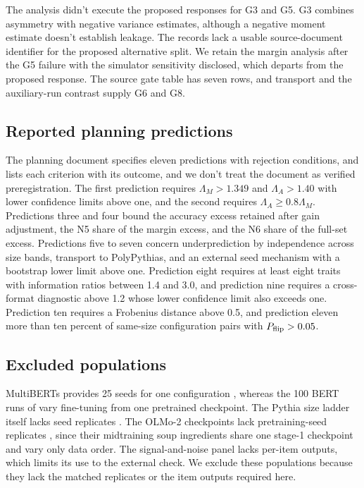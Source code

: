The analysis didn't execute the proposed responses for G3 and G5. G3 combines asymmetry with negative variance estimates, although a negative moment estimate doesn't establish leakage. The records lack a usable source-document identifier for the proposed alternative split. We retain the margin analysis after the G5 failure with the simulator sensitivity disclosed, which departs from the proposed response. The source gate table has seven rows, and transport and the auxiliary-run contrast supply G6 and G8.
\subsection{Reported planning predictions}
The planning document specifies eleven predictions with rejection conditions, and  lists each criterion with its outcome, and we don't treat the document as verified preregistration. The first prediction requires $\Lambda_M>1.349$ and $\Lambda_A>1.40$ with lower confidence limits above one, and the second requires $\Lambda_A\geq0.8\Lambda_M$. Predictions three and four bound the accuracy excess retained after gain adjustment, the N5 share of the margin excess, and the N6 share of the full-set excess. Predictions five to seven concern underprediction by independence across size bands, transport to PolyPythias, and an external seed mechanism with a bootstrap lower limit above one. Prediction eight requires at least eight traits with information ratios between 1.4 and 3.0, and prediction nine requires a cross-format diagnostic above 1.2 whose lower confidence limit also exceeds one. Prediction ten requires a Frobenius distance above 0.5, and prediction eleven more than ten percent of same-size configuration pairs with $P_{\rm flip}>0.05$.
\subsection{Excluded populations}
MultiBERTs provides 25 seeds for one configuration \citep{sellam2022}, whereas the 100 BERT runs of \citet{mccoy2020} vary fine-tuning from one pretrained checkpoint. The Pythia size ladder itself lacks seed replicates \citep{biderman2023}. The OLMo-2 checkpoints lack pretraining-seed replicates \citep{teamolmo2025}, since their midtraining soup ingredients share one stage-1 checkpoint and vary only data order. The signal-and-noise panel lacks per-item outputs, which limits its use to the external check. We exclude these populations because they lack the matched replicates or the item outputs required here.

